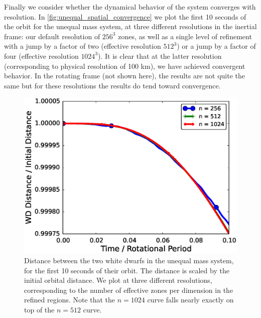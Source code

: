 \documentclass[iop]{../emulateapj}
\begin{document}
Finally we consider whether the dynamical behavior of the system converges with resolution. 
In \autoref{fig:unequal_spatial_convergence} we plot the first 10 seconds of the orbit for 
the unequal mass system, at three different resolutions in the inertial frame: our default 
resolution of $256^3$ zones, as well as a single level of refinement with a jump by a factor of 
two (effective resolution $512^3$) or a jump by a factor of four (effective resolution $1024^3$). 
It is clear that at the latter resolution (corresponding to physical resolution of 100 km), 
we have achieved convergent behavior. In the rotating frame (not shown here), the results are 
not quite the same but for these resolutions the results do tend toward convergence.

\begin{figure}
  \centering
  \includegraphics[scale=0.45]{plots/spatial_convergence_rot0.eps}
  \caption{Distance between the two white dwarfs in the unequal mass system, for the first 
           10 seconds of their orbit. The distance is scaled by the initial orbital distance. 
           We plot at three different resolutions, corresponding to the number of 
           effective zones per dimension in the refined regions. Note that the $n = 1024$ curve
           falls nearly exactly on top of the $n = 512$ curve.\label{fig:unequal_spatial_convergence}}
\end{figure}



\end{document}
